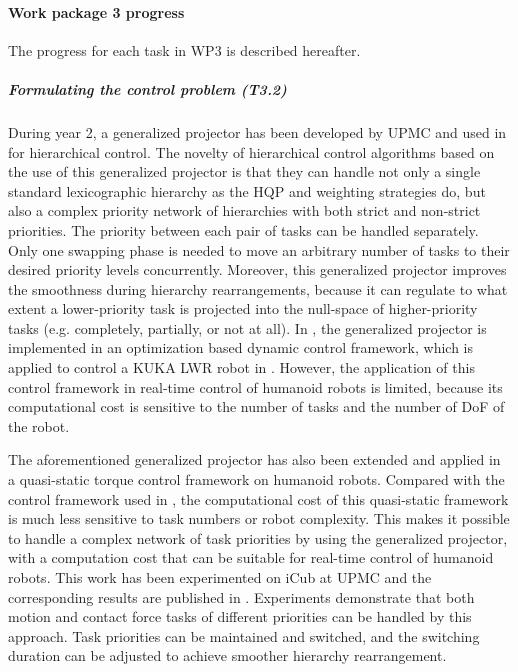  
\paragraph{Work package 3 progress}

The progress for each task in WP3 is described hereafter.

\subparagraph*{Formulating the control problem (T3.2)}

During year 2, a generalized projector has been developed by UPMC and used in \cite{liu-AutRob2015} for hierarchical control. The novelty of hierarchical control algorithms based on the use of this generalized projector is that they can handle not only a single standard lexicographic hierarchy as the HQP and weighting strategies do, but also a complex priority network of hierarchies with both strict and non-strict priorities. The priority between each pair of tasks can be handled separately. Only one swapping phase is needed to move an arbitrary number of tasks to their desired priority levels concurrently.  Moreover, this generalized projector improves the smoothness during hierarchy rearrangements, because it can regulate to what extent a lower-priority task is projected into the null-space of higher-priority tasks (e.g. completely, partially, or not at all). In \cite{liu-AutRob2015}, the generalized projector is implemented in an optimization based dynamic control framework, which is applied to control a KUKA LWR robot in \cite{liu_ICRA2015}. However, the application of this control framework in real-time control of humanoid robots is limited, because its computational cost is sensitive to the number of tasks and the number of DoF of the robot.

The aforementioned generalized projector has also been extended and applied in a quasi-static torque control framework on humanoid robots. Compared with the control framework used in \cite{liu-AutRob2015}, the computational cost of this quasi-static framework is much less sensitive to task numbers or robot complexity. This makes it possible to handle a complex network of task priorities by using the generalized projector, with a computation cost that can be suitable for real-time control of humanoid robots. This work has been experimented on iCub at UPMC and the corresponding results are published in \cite{liu-AutRobSI2015}. Experiments demonstrate that both motion and contact force tasks of different priorities can be handled by this approach. Task priorities can be maintained and switched, and the switching duration can be adjusted to achieve smoother hierarchy rearrangement.

